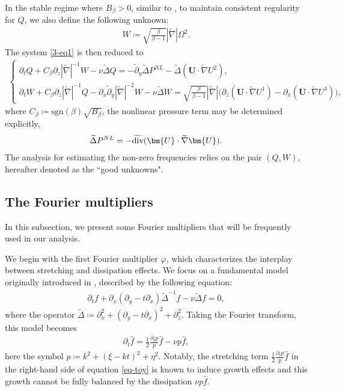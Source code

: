 \documentclass[11pt,reqno]{article}
\numberwithin{equation}{section}
\newcommand\U{\bm{U}}
\newcommand \tri {\coloneqq}
\let\pa=\partial
\let\f=\frac
\def\dive{\mathop{\rm div}\nolimits}
\begin{document}
In the stable regime where $B_{\beta}>0$, similar to \cite{Coti-Zotto-Widmayer-2025},  to maintain consistent regularity for $Q$, we also define the following unknown:
\begin{align}\label{def-W-nonzero}
W\tri \sqrt{\f{\beta}{\beta-1}}|\widetilde{\nabla}| \Omega^2.
\end{align}
The system \eqref{3-eq1} is then reduced to
\begin{align}\label{3-eq2}
\left\{\begin{array}{l}
	\displaystyle
	\pa_t Q +C_{\beta} \pa_{z} |\widetilde{\nabla}| ^{-1}W-\nu \widetilde{\Delta}Q
	=-\tilde{\pa}_y \widetilde{\Delta} P^{NL}-\widetilde{\Delta}(\U\cdot\widetilde{\nabla}U^2),
	\\[1ex]
	\displaystyle
	\pa_t W+C_{\beta} \pa_{z} |\widetilde{\nabla}| ^{-1}Q
	-\pa_x\tilde{\pa}_y |\widetilde{\nabla}| ^{-2}W
	-\nu \widetilde{\Delta}W
	=\sqrt{\f{\beta}{\beta-1}} |\widetilde{\nabla}| 
	\big(
	\pa_{z}(\U\cdot\widetilde{\nabla}U^1)-\pa_{x}(\U\cdot\widetilde{\nabla}U^3)
	\big),
\end{array}\right.
\end{align}
where $C_{\beta} \tri\mathrm{sgn}(\beta)\sqrt{B_\beta}$, the nonlinear pressure term may be determined explicitly,
\begin{align*}
\widetilde{\Delta} P^{NL} =-\widetilde{\dive} (\U\cdot \widetilde{\nabla} \U).
\end{align*}
The analysis for estimating the non-zero frequencies relies on the pair $(Q,W)$, hereafter denoted as the  ``good unknowns".


\subsection{The Fourier multipliers}\label{sect-F-M}
In this subsection, we present some Fourier multipliers that will be frequently used in our analysis.

We begin with the first Fourier multiplier $\varphi$, which characterizes the interplay between stretching and dissipation effects.
We focus on a fundamental model originally introduced in \cite{Bedrossian-Germain-Masmoudi-2017}, described by the following equation:
\begin{align*}
\pa_t f+\pa_x(\pa_y-t\pa_x) \widetilde{\Delta}^{-1} f-\nu \widetilde{\Delta} f=0,
\end{align*}
where the operator $\widetilde{\Delta}\tri \pa_x^2+(\pa_y-t\pa_x)^2+\pa_z^2$.
Taking the Fourier transform, this model becomes
\begin{align}\label{eq-toy}
\partial_{t} \hat{f} =\f12\f{\pa_{t}p}{p}\hat{f}-\nu p \hat{f},
\end{align}
here the symbol $p\tri k^2+(\xi-kt)^2+\eta^2$.
Notably, the stretching  term $\f12\f{\pa_{t}p}{p}\hat{f}$ in the right-hand side of equation \eqref{eq-toy} is known to induce growth effects and 
 this growth cannot be fully balanced by the dissipation $\nu p\hat{f}$. 
\end{document}
